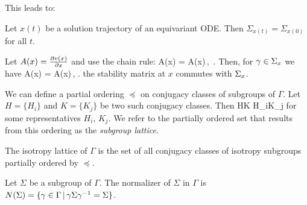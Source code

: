 This leads to:
\begin{proposition}
 Let $x(t)$ be a solution trajectory of an equivariant ODE. Then $\Sigma_{x(t)}=\Sigma_{x(0)}$ for all $t$.
\label{pro:gfInv}
\end{proposition}

Let $A(x)=\frac{\partial v(x)}{\partial x}$ and use the chain rule:
\beq
	A(\gamma x) \gamma = \gamma A(x)\,, \qquad \gamma\in\Gamma\,.
	\label{eq:LrzGroupOrb}
\eeq
Then, for $\gamma\in\Sigma_{x}$ we have
\beq
	A(x) \gamma = \gamma A(x)\,, \qquad \gamma\in{}.
	\label{eq:LrzCommut}
\eeq
\ie the stability matrix at $x$ commutes with $\Sigma_{x}$.

We can define a partial ordering $\preceq$ on conjugacy classes of subgroups of $\Gamma$. Let $H=\{H_i\}$ and $K=\{K_j\}$
be two such conjugacy classes. Then
\beq
	H\preceq K \Leftrightarrow H_i\subseteq K_j
	\label{eq:Gorder}
\eeq
for some representatives $H_i,\,K_j$. We refer to the partially ordered set that results from this ordering as the \emph{subgroup lattice}.

\begin{definition}
 The isotropy lattice of $\Gamma$ is the set of all conjugacy classes of isotropy subgroups
 partially ordered by $\preceq$.
\end{definition}

\begin{definition}
 Let $\Sigma$ be a subgroup of $\Gamma$. The normalizer of $\Sigma$ in $\Gamma$ is
 $N(\Sigma)=\{\gamma\in\Gamma\, |\, \gamma\Sigma\gamma^{-1}=\Sigma\}$.
\end{definition}

